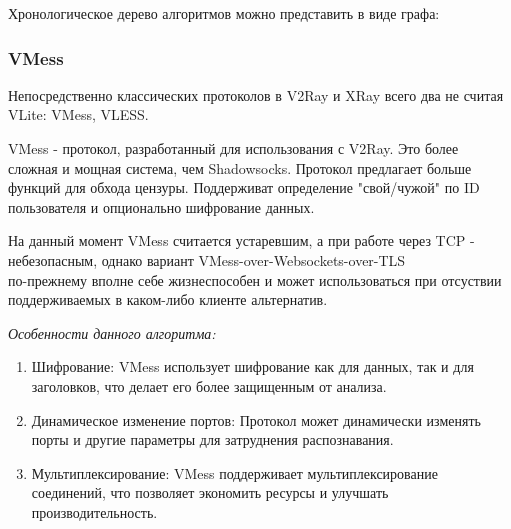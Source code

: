 \documentclass[utf8,14pt,a4paper,oneside,russian]{book}
\begin{document}

Хронологическое дерево алгоритмов можно представить в виде графа:


\subsubsection{VMess}
Непосредственно классических протоколов в V2Ray и XRay всего два не считая VLite: VMess, VLESS.

VMess - протокол, разработанный для использования с V2Ray. Это более сложная и мощная система, чем Shadowsocks. Протокол предлагает больше
функций для обхода цензуры. Поддерживат определение "свой/чужой" по ID пользователя и опционально шифрование данных.

На данный момент VMess считается устаревшим, а при работе через TCP - небезопасным, однако вариант VMess-over-Websockets-over-TLS\\
по-прежнему вполне себе жизнеспособен и может использоваться при отсуствии поддерживаемых в каком-либо клиенте альтернатив.

\textit{Особенности данного алгоритма:}
\begin{enumerate}
    \item Шифрование: VMess использует шифрование как для данных, так и для заголовков, что делает его более защищенным от анализа.
    \item Динамическое изменение портов: Протокол может динамически изменять порты и другие параметры для затруднения распознавания.
    \item Мультиплексирование: VMess поддерживает мультиплексирование соединений, что позволяет экономить ресурсы и улучшать производительность.
\end{enumerate}
\end{document}
